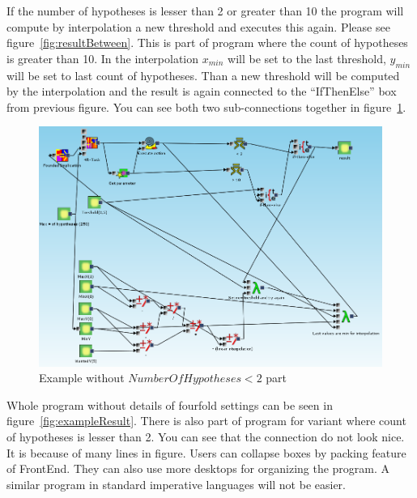 \documentclass[a4paper,12pt]{book}
\begin{document}
If the number of hypotheses is lesser than 2 or greater than 10 the program will compute by interpolation a new threshold and executes this again. Please see figure~\ref{fig:resultBetween}. This is part of program where the count of hypotheses is greater than 10. In the interpolation $x_{min}$ will be set to the last threshold, $y_{min}$ will be set to last count of hypotheses. Than a new threshold will be computed by the interpolation and the result is again connected to the ``IfThenElse'' box from previous figure. You can see both two sub-connections together in figure~\ref{fig:exampleWithoutInterpolationOnMax}.

\begin{figure}
	\includegraphics[width=1\textwidth]{exampleWithoutInterpolationOnMax}
	\caption{Example without $NumberOfHypotheses < 2$ part}
	\label{fig:exampleWithoutInterpolationOnMax}
\end{figure}

Whole program without details of fourfold settings can be seen in figure~\ref{fig:exampleResult}. There is also part of program for variant where count of hypotheses is lesser than 2. You can see that the connection do not look nice. It is because of many lines in figure. Users can collapse boxes by packing feature of FrontEnd. They can also use more desktops for organizing the program. A similar program in standard imperative languages will not be easier.
\end{document}
